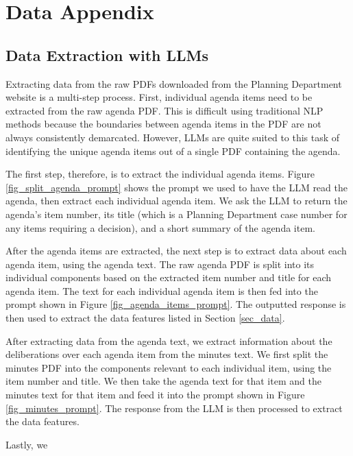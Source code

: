 \section{Data Appendix} \label{sec_data_appendix}

\subsection{Data Extraction with LLMs}

Extracting data from the raw PDFs downloaded from the Planning Department website is a multi-step process. First, individual agenda items need to be extracted from the raw agenda PDF. This is difficult using traditional NLP methods because the boundaries between agenda items in the PDF are not always consistently demarcated. However, LLMs are quite suited to this task of identifying the unique agenda items out of a single PDF containing the agenda.

The first step, therefore, is to extract the individual agenda items. Figure \ref{fig_split_agenda_prompt} shows the prompt we used to have the LLM read the agenda, then extract each individual agenda item. We ask the LLM to return the agenda's item number, its title (which is a Planning Department case number for any items requiring a decision), and a short summary of the agenda item.

After the agenda items are extracted, the next step is to extract data about each agenda item, using the agenda text. The raw agenda PDF is split into its individual components based on the extracted item number and title for each agenda item. The text for each individual agenda item is then fed into the prompt shown in Figure \ref{fig_agenda_items_prompt}. The outputted response is then used to extract the data features listed in Section \ref{sec_data}.

After extracting data from the agenda text, we extract information about the deliberations over each agenda item from the minutes text. We first split the minutes PDF into the components relevant to each individual item, using the item number and title. We then take the agenda text for that item and the minutes text for that item and feed it into the prompt shown in Figure \ref{fig_minutes_prompt}. The response from the LLM is then processed to extract the data features.

Lastly, we 

